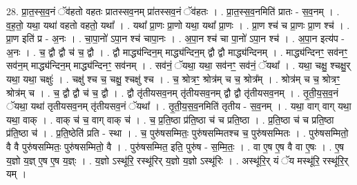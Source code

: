 \documentclass[17pt]{extarticle}
\begin{document}
28. प्रा॒त॒स्स॒व॒नं ॅव॑हतो वहतः प्रातस्सव॒नम् प्रा॑तस्सव॒नं ॅव॑हतः । . प्रा॒त॒स्स॒व॒नमिति॑ प्रातः - स॒व॒नम् । . व॒ह॒तो॒ यथा॒ यथा॑ वहतो वहतो॒ यथा᳚ । . यथा᳚ प्रा॒णः प्रा॒णो यथा॒ यथा᳚ प्रा॒णः । . प्रा॒ण श्च॑ च प्रा॒णः प्रा॒ण श्च॑ । . प्रा॒ण इति॑ प्र - अ॒नः । . चा॒पा॒नो॑ ऽपा॒न श्च॑ चापा॒नः । . अ॒पा॒न श्च॑ चा पा॒नो॑ ऽपा॒न श्च॑ । . अ॒पा॒न इत्य॑प - अ॒नः । . च॒ द्वौ द्वौ च॑ च॒ द्वौ । . द्वौ माद्ध्य॑न्दिन॒म् माद्ध्य॑न्दिन॒म् द्वौ द्वौ माद्ध्य॑न्दिनम् । . माद्ध्य॑न्दिनꣳ॒॒ सव॑नꣳ॒॒ सव॑न॒म् माद्ध्य॑न्दिन॒म् माद्ध्य॑न्दिनꣳ॒॒ सव॑नम् । . सव॑नं॒ ॅयथा॒ यथा॒ सव॑नꣳ॒॒ सव॑नं॒ ॅयथा᳚ । . यथा॒ चक्षु॒ श्चक्षु॒र् यथा॒ यथा॒ चक्षुः॑ । . चक्षु॑ श्च च॒ चक्षु॒ श्चक्षु॑ श्च । . च॒ श्रोत्रꣳ॒॒ श्रोत्र॑म् च च॒ श्रोत्र᳚म् । . श्रोत्र॑म् च च॒ श्रोत्रꣳ॒॒ श्रोत्र॑म् च । . च॒ द्वौ द्वौ च॑ च॒ द्वौ । . द्वौ तृ॑तीयसव॒नम् तृ॑तीयसव॒नम् द्वौ द्वौ तृ॑तीयसव॒नम् । . तृ॒ती॒य॒स॒व॒नं ॅयथा॒ यथा॑ तृतीयसव॒नम् तृ॑तीयसव॒नं ॅयथा᳚ । . तृ॒ती॒य॒स॒व॒नमिति॑ तृतीय - स॒व॒नम् । . यथा॒ वाग् वाग् यथा॒ यथा॒ वाक् । . वाक् च॑ च॒ वाग् वाक् च॑ । . च॒ प्र॒ति॒ष्ठा प्र॑ति॒ष्ठा च॑ च प्रति॒ष्ठा । . प्र॒ति॒ष्ठा च॑ च प्रति॒ष्ठा प्र॑ति॒ष्ठा च॑ । . प्र॒ति॒ष्ठेति॑ प्रति - स्था । . च॒ पुरु॑षसम्मितः॒ पुरु॑षसम्मितश्च च॒ पुरु॑षसम्मितः । . पुरु॑षसम्मितो॒ वै वै पुरु॑षसम्मितः॒ पुरु॑षसम्मितो॒ वै । . पुरु॑षसम्मित॒ इति॒ पुरु॑ष - स॒म्मि॒तः॒ । . वा ए॒ष ए॒ष वै वा ए॒षः । . ए॒ष य॒ज्ञो य॒ज्ञ् ए॒ष ए॒ष य॒ज्ञ्ः । . य॒ज्ञो ऽस्थू॑रि॒ रस्थू॑रिर् य॒ज्ञो य॒ज्ञो ऽस्थू॑रिः । . अस्थू॑रि॒र् यं ॅय मस्थू॑रि॒ रस्थू॑रि॒र् यम् । \newline
\end{document}
